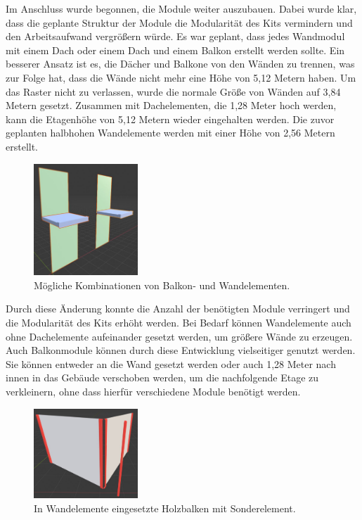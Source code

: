 Im Anschluss wurde begonnen, die Module weiter auszubauen. Dabei wurde klar, dass die geplante Struktur der Module die Modularität des Kits vermindern und den Arbeitsaufwand vergrößern würde. Es war geplant, dass jedes Wandmodul mit einem Dach oder einem Dach und einem Balkon erstellt werden sollte. Ein besserer Ansatz ist es, die Dächer und Balkone von den Wänden zu trennen, was zur Folge hat, dass die Wände nicht mehr eine Höhe von 5,12 Metern haben. Um das Raster nicht zu verlassen, wurde die normale Größe von Wänden auf 3,84 Metern gesetzt. Zusammen mit Dachelementen, die 1,28 Meter hoch werden, kann die Etagenhöhe von 5,12 Metern wieder eingehalten werden. Die zuvor geplanten halbhohen Wandelemente werden mit einer Höhe von 2,56 Metern erstellt. 
\newpage
\begin{figure}
\centering 
  \vspace{-0.5pt}
    \includegraphics[width=0.35\textwidth]{bilder/balconposition}
      \caption{Mögliche Kombinationen von Balkon- und Wandelementen.}\label{balconposition}
      \vspace{-14pt}
\end{figure}
Durch diese Änderung konnte die Anzahl der benötigten Module verringert und die Modularität des Kits erhöht werden. Bei Bedarf können Wandelemente auch ohne Dachelemente aufeinander gesetzt werden, um größere Wände zu erzeugen. Auch Balkonmodule können durch diese Entwicklung vielseitiger genutzt werden. Sie können entweder an die Wand gesetzt werden oder auch 1,28 Meter nach innen in das Gebäude verschoben werden, um die nachfolgende Etage zu verkleinern, ohne dass hierfür verschiedene Module benötigt werden.
\par
\begin{figure}
\centering 
  \vspace{-11.5pt}
    \includegraphics[width=0.35\textwidth]{bilder/holzecke}
      \caption{In Wandelemente eingesetzte Holzbalken mit Sonderelement.}\label{holzecke}
      \vspace{-14pt}
\end{figure}
